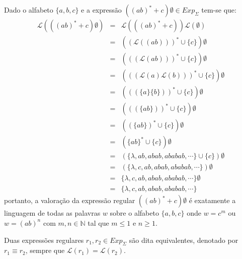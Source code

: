 \begin{example}
	Dado o alfabeto $\{a,b,c\}$ e a expressão $((ab)^* + c)\emptyset \in Exp_\Sigma$ tem-se que:
	\begin{eqnarray*}
		\mathcal{L}(((ab)^* + c) \emptyset) & = & \mathcal{L}(((ab)^* + c))\mathcal{L}(\emptyset)\\
		& = & ((\mathcal{L}((ab)))^* \cup \{c\})\emptyset\\
		& = & (((\mathcal{L}(ab)))^* \cup \{c\})\emptyset\\
		& = & (((\mathcal{L}(a)\mathcal{L}(b)))^* \cup \{c\})\emptyset\\
		& = & (((\{a\}\{b\}))^* \cup \{c\})\emptyset\\
		& = & (((\{ab\}))^* \cup \{c\})\emptyset\\
		& = & ((\{ab\})^* \cup \{c\})\emptyset\\
		& = & (\{ab\}^* \cup \{c\})\emptyset\\
		& = & (\{\lambda, ab, abab, ababab, \cdots\} \cup \{c\})\emptyset\\
		& = & (\{\lambda, c, ab, abab, ababab, \cdots\})\emptyset\\
		& = & \{\lambda, c, ab, abab, ababab, \cdots\}\emptyset\\
		& = & \{\lambda, c, ab, abab, ababab, \cdots\}
	\end{eqnarray*}
	portanto, a valoração da expressão regular $((ab)^* + c)\emptyset$ é exatamente a linguagem de todas as palavras $w$ sobre o alfabeto $\{a,b,c\}$  onde $w = c^m$ ou $w = (ab)^n$ com $m,n \in \mathbb{N}$ tal que $m \leq 1$ e $n \geq 1$.
\end{example}

\begin{definition}
	Duas expressões regulares $r_1, r_2 \in Exp_\Sigma$ são dita equivalentes, denotado por $r_1 \equiv r_2$, sempre que $\mathcal{L}(r_1) = \mathcal{L}(r_2)$.
\end{definition}

